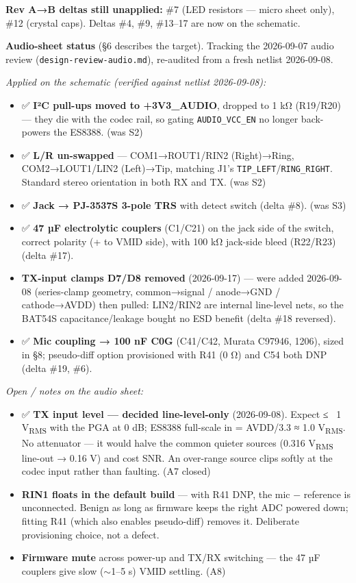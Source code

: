 \documentclass[11pt]{article}
\begin{document}
\textbf{Rev A→B deltas still unapplied:} \#7 (LED resistors — micro sheet only), \#12 (crystal caps).
Deltas \#4, \#9, \#13–17 are now on the schematic.

\textbf{Audio-sheet status} (§6 describes the target). Tracking the 2026-09-07 audio review
(\texttt{design-review-audio.md}), re-audited from a fresh netlist 2026-09-08.

\textit{Applied on the schematic (verified against netlist 2026-09-08):}
\begin{itemize}[leftmargin=1.4em]
\item ✅ \textbf{I²C pull-ups moved to +3V3\_AUDIO}, dropped to 1 kΩ (R19/R20) — they die with the
  codec rail, so gating \texttt{AUDIO\_VCC\_EN} no longer back-powers the ES8388. (was S2)
\item ✅ \textbf{L/R un-swapped} — COM1→ROUT1/RIN2 (Right)→Ring, COM2→LOUT1/LIN2 (Left)→Tip, matching
  J1's \texttt{TIP\_LEFT}/\texttt{RING\_RIGHT}. Standard stereo orientation in both RX and TX. (was S2)
\item ✅ \textbf{Jack → PJ-3537S 3-pole TRS} with detect switch (delta \#8). (was S3)
\item ✅ \textbf{47 µF electrolytic couplers} (C1/C21) on the jack side of the switch, correct
  polarity (+ to VMID side), with 100 kΩ jack-side bleed (R22/R23) (delta \#17).
\item \textbf{TX-input clamps D7/D8 removed} (2026-09-17) — were added 2026-09-08 (series-clamp
  geometry, common→signal / anode→GND / cathode→AVDD) then pulled: LIN2/RIN2 are internal line-level
  nets, so the BAT54S capacitance/leakage bought no ESD benefit (delta \#18 reversed).
\item ✅ \textbf{Mic coupling → 100 nF C0G} (C41/C42, Murata C97946, 1206), sized in §8; pseudo-diff
  option provisioned with R41 (0 Ω) and C54 both DNP (delta \#19, \#6).
\end{itemize}

\textit{Open / notes on the audio sheet:}
\begin{itemize}[leftmargin=1.4em]
\item ✅ \textbf{TX input level — decided line-level-only} (2026-09-08). Expect ≤ ~1 V\textsubscript{RMS}
  with the PGA at 0 dB; ES8388 full-scale in = AVDD/3.3 ≈ 1.0 V\textsubscript{RMS}. No attenuator — it
  would halve the common quieter sources (0.316 V\textsubscript{RMS} line-out → 0.16 V) and cost SNR.
  An over-range source clips softly at the codec input rather than faulting. (A7 closed)
\item \textbf{RIN1 floats in the default build} — with R41 DNP, the mic − reference is unconnected.
  Benign as long as firmware keeps the right ADC powered down; fitting R41 (which also enables
  pseudo-diff) removes it. Deliberate provisioning choice, not a defect.
\item \textbf{Firmware mute} across power-up and TX/RX switching — the 47 µF couplers give slow
  ($\sim$1–5 s) VMID settling. (A8)
\end{itemize}
\end{document}
